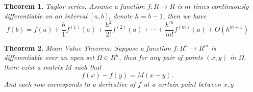 \documentclass[12pt]{article}
\newtheorem{theorem}{Theorem}[section]
\begin{document}
\begin{theorem}
	Taylor series: Assume a function $f: R\to R$ is $m$ times continuously differentiable on an interval $\left[a,b\right]$, denote $h=b-1$, then we have
	\[
	f(b) = f(a) + \frac{h}{1}f^{(1)}(a) + \frac{h^2}{2!} f^{(2)}(a) + \cdots +\frac{h^m}{m!}f^{(m)}(a) + O(h^{m+1})
	\]
\end{theorem}
\begin{theorem}
	Mean Value Theorem: Suppose a function $f: R^n\to R^m$ is differentiable over an open set $\Omega\in R^n$, then for any pair of points $(x,y)$ in $\Omega$, there exist a matrix $M$ such that \[
	f(x) - f(y) = M(x-y).\]
	And each row corresponds to a derivative of $f$ at a certain point between $x,y$
\end{theorem}
\end{document}
